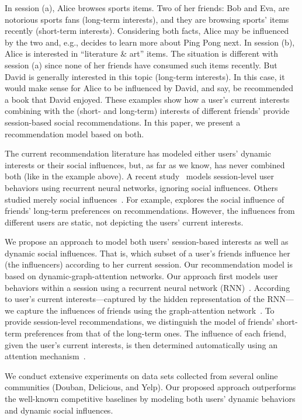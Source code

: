 \documentclass[sigconf]{acmart}
\begin{document}
In session (a), Alice browses sports items.
Two of her friends: Bob and Eva, are notorious sports fans (long-term interests), and they are browsing sports' items recently (short-term interests). Considering both facts, Alice may be influenced by the two and, e.g., decides to learn more about Ping Pong next. In session (b), Alice is interested in ``literature \& art'' items. The situation is different with session (a) since none of her friends have consumed such items recently. But David is generally interested in this topic (long-term interests). In this case, it would make sense for Alice to be influenced by David, and say, be recommended a book that David enjoyed.
These examples show how a user's current interests combining with the (short- and long-term) interests of different friends' provide session-based social recommendations. In this paper, we present a recommendation model based on both.


The current recommendation literature has modeled either users' dynamic interests or their social influences, but, as far as we know, has never combined both (like in the example above). A recent study~\cite{hidasi2016session} models session-level user behaviors using recurrent neural networks, ignoring social influences. Others studied merely social influences~\cite{ma2011recommender,zhao2014leveraging,chaney2015probabilistic}. For example, \citet{ma2011recommender} explores the social influence of friends' long-term preferences on recommendations. However, the influences from different users are static, not depicting the users' current interests.

We propose an approach to model both users' session-based interests as well as dynamic social influences. That is, which subset of a user's friends influence her (the influencers) according to her current session.
Our recommendation model is based on dynamic-graph-attention networks. Our approach first models user behaviors within a session using a recurrent neural network (RNN)~\cite{elman1990finding}. 
According to user's current interests---captured by the hidden representation of the RNN---we capture the influences of friends using the graph-attention network~\cite{Velickovic2018graph}. To provide session-level recommendations, we distinguish the model of friends' short-term preferences from that of the long-term ones.
The influence of each friend, given the user's current interests, is then determined automatically using an attention mechanism~\cite{bahdanau2015neural,xu2015show}.


We conduct extensive experiments on data sets collected from several online communities (Douban, Delicious, and Yelp). Our proposed approach outperforms the well-known competitive baselines by modeling both users' dynamic behaviors and dynamic social influences.
\end{document}
